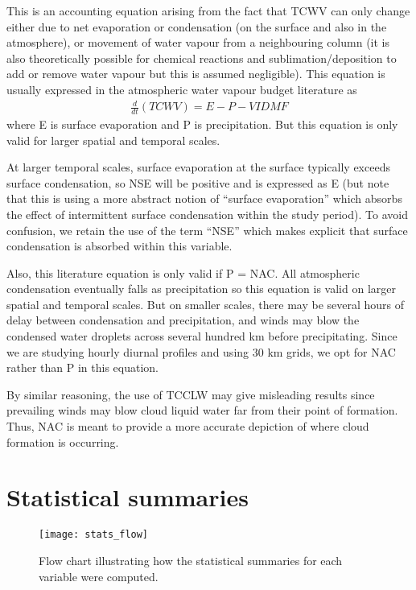 This is an accounting equation arising from the fact that \ac{TCWV} can only change either due to net evaporation or condensation (on the surface and also in the atmosphere), or movement of water vapour from a neighbouring column (it is also theoretically possible for chemical reactions and sublimation/deposition to add or remove water vapour but this is assumed negligible). This equation is usually expressed in the atmospheric water vapour budget literature \citep{norris2020, yan2020} as
\begin{eqnarray}
	\frac{d}{dt}(TCWV) = E - P - VIDMF
\end{eqnarray}
where E is surface evaporation and P is precipitation. But this equation is only valid for larger spatial and temporal scales. 

At larger temporal scales, surface evaporation at the surface typically exceeds surface condensation, so \ac{NSE} will be positive and is expressed as E (but note that this is using a more abstract notion of “surface evaporation” which absorbs the effect of intermittent surface condensation within the study period). To avoid confusion, we retain the use of the term “NSE” which makes explicit that surface condensation is absorbed within this variable. 

Also, this literature equation is only valid if P = NAC. All atmospheric condensation eventually falls as precipitation so this equation is valid on larger spatial and temporal scales. But on smaller scales, there may be several hours of delay between condensation and precipitation, and winds may blow the condensed water droplets across several hundred km before precipitating. Since we are studying hourly diurnal profiles and using 30 km grids, we opt for \ac{NAC} rather than P in this equation.

By similar reasoning, the use of \ac{TCCLW} may give misleading results since prevailing winds may blow cloud liquid water far from their point of formation. Thus, \ac{NAC} is meant to provide a more accurate depiction of where cloud formation is occurring.

\newpage

\section{Statistical summaries}
\label{sec:method_stats}

\begin{figure}[!ht]
	\centering
	\texttt{[image: stats\_flow]}
	\caption[Statistics Flow Chart]{Flow chart illustrating how the statistical summaries for each variable were computed.}
	\label{fig:stats_flow}
\end{figure}

